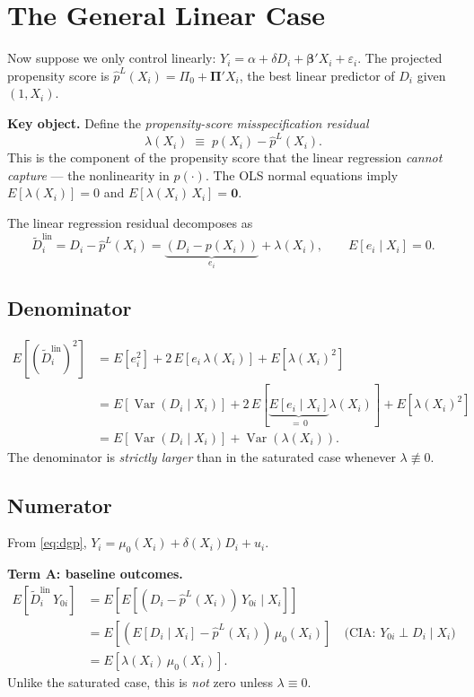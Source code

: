 \documentclass[11pt]{article}
\theoremstyle{remark}
\begin{document}
\section{The General Linear Case}

Now suppose we only control linearly: $Y_i = \alpha + \delta D_i + \bm\beta'X_i +
\varepsilon_i$.  The projected propensity score is $\hat p^L(X_i) = \Pi_0 + \bm\Pi'X_i$,
the best linear predictor of $D_i$ given $(1, X_i)$.

\textbf{Key object.}  Define the \emph{propensity-score misspecification residual}
\begin{equation}\label{eq:lambda}
  \lambda(X_i) \;\equiv\; p(X_i) - \hat p^L(X_i).
\end{equation}
This is the component of the propensity score that the linear regression \emph{cannot
capture} --- the nonlinearity in $p(\cdot)$.  The OLS normal equations imply
$E[\lambda(X_i)] = 0$ and $E[\lambda(X_i)\,X_i] = \bm 0$.

The linear regression residual decomposes as
\[
  \tilde D_i^{\mathrm{lin}}
  = D_i - \hat p^L(X_i)
  = \underbrace{(D_i - p(X_i))}_{\displaystyle e_i} + \lambda(X_i),
  \qquad E[e_i\mid X_i]=0.
\]

\subsection{Denominator}

\begin{align*}
  E\!\left[(\tilde D_i^{\mathrm{lin}})^2\right]
  &= E[e_i^2] + 2\,E[e_i\,\lambda(X_i)] + E[\lambda(X_i)^2] \\
  &= E\!\left[\operatorname{Var}(D_i\mid X_i)\right]
     + 2\,E\!\left[\underbrace{E[e_i\mid X_i]}_{=\,0}\lambda(X_i)\right]
     + E[\lambda(X_i)^2] \\[4pt]
  &= E\!\left[\operatorname{Var}(D_i\mid X_i)\right] + \operatorname{Var}(\lambda(X_i)).
\end{align*}
The denominator is \emph{strictly larger} than in the saturated case whenever
$\lambda \not\equiv 0$.

\subsection{Numerator}

From \eqref{eq:dgp}, $Y_i = \mu_0(X_i) + \delta(X_i)D_i + u_i$.

\medskip\noindent\textbf{Term A: baseline outcomes.}
\begin{align*}
  E[\tilde D_i^{\mathrm{lin}}\,Y_{0i}]
  &= E\!\left[E[(D_i - \hat p^L(X_i))\,Y_{0i}\mid X_i]\right]\\
  &= E\!\left[(E[D_i\mid X_i] - \hat p^L(X_i))\,\mu_0(X_i)\right]
     \quad\text{(CIA: }Y_{0i}\perp D_i\mid X_i\text{)}\\
  &= E[\lambda(X_i)\,\mu_0(X_i)].
\end{align*}
Unlike the saturated case, this is \emph{not} zero unless $\lambda \equiv 0$.
\end{document}
